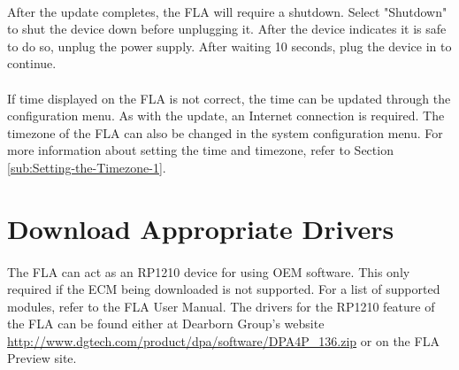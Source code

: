 \documentclass[11pt, oneside]{book}
\begin{document}
\paragraph{  }
After the update completes, the FLA will require a shutdown. Select "Shutdown" to shut the device down before unplugging it. After the device indicates it is safe to do so, unplug the power supply. After waiting 10 seconds, plug the device in to continue.
\paragraph{  }
If time displayed on the FLA is not correct, the time can be updated through the configuration menu. As with the update, an Internet connection is required. The timezone of the FLA can also be changed in the system configuration menu. For more information about setting the time and timezone, refer to Section \ref{sub:Setting-the-Timezone-1}.
\section{Download Appropriate Drivers}\label{subsec:RP1210_Drivers}
\paragraph{  }
The FLA can act as an RP1210 device for using OEM software. This only required if the ECM being downloaded is not supported. For a list of supported modules, refer to the FLA User Manual. The drivers for the RP1210 feature of the FLA can be found either at Dearborn Group's website
\url{http://www.dgtech.com/product/dpa/software/DPA4P_136.zip} 
or on the FLA Preview site.
\end{document}
